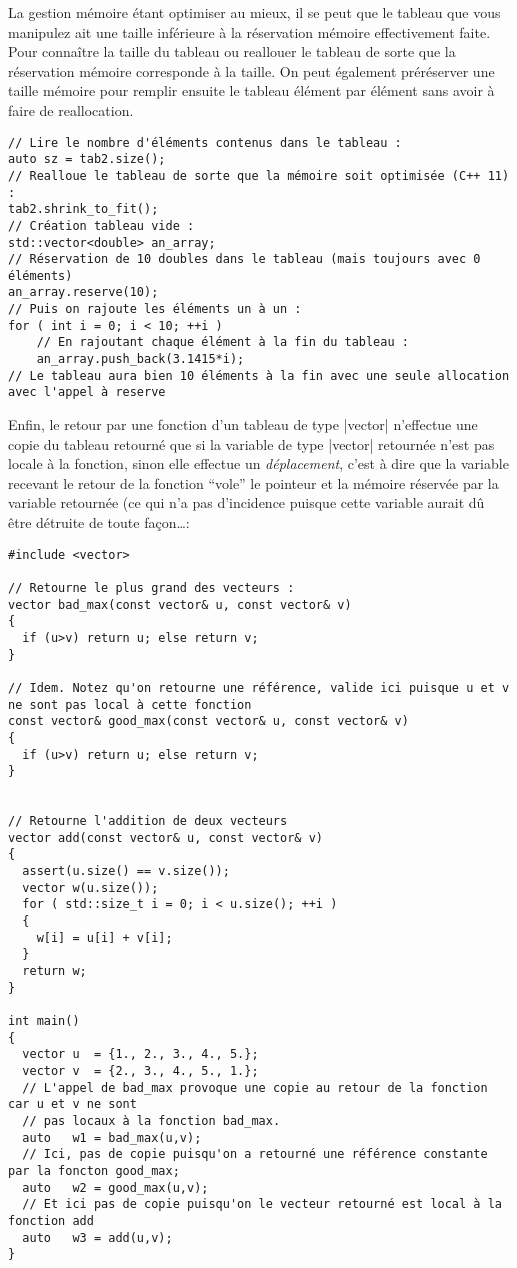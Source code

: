La gestion mémoire étant optimiser au mieux, il se peut que le tableau que vous manipulez ait une taille inférieure à la réservation mémoire effectivement faite. Pour connaître la taille du tableau ou reallouer le tableau de sorte que la réservation mémoire corresponde à la taille.
On peut également préréserver une taille mémoire pour remplir ensuite le tableau élément par élément sans avoir à faire de reallocation.

\begin{lstlisting}
// Lire le nombre d'éléments contenus dans le tableau :
auto sz = tab2.size();
// Realloue le tableau de sorte que la mémoire soit optimisée (C++ 11) :
tab2.shrink_to_fit(); 
// Création tableau vide :
std::vector<double> an_array;
// Réservation de 10 doubles dans le tableau (mais toujours avec 0 éléments)
an_array.reserve(10);
// Puis on rajoute les éléments un à un :
for ( int i = 0; i < 10; ++i )
    // En rajoutant chaque élément à la fin du tableau :
    an_array.push_back(3.1415*i);
// Le tableau aura bien 10 éléments à la fin avec une seule allocation avec l'appel à reserve
\end{lstlisting}

Enfin, le retour par une fonction d'un tableau de type |vector| n'effectue une copie du tableau retourné
que si la variable de type |vector| retournée n'est pas locale à la fonction, sinon
elle effectue un \textsl{déplacement}, c'est à dire que la variable recevant le retour de la fonction ``vole'' le pointeur et la mémoire réservée par la variable retournée (ce qui n'a pas d'incidence puisque cette variable aurait dû être détruite de toute façon\ldots :

\begin{lstlisting}[caption=retour d'une variable de type vector]
#include <vector>

// Retourne le plus grand des vecteurs :
vector bad_max(const vector& u, const vector& v)
{
  if (u>v) return u; else return v;
}

// Idem. Notez qu'on retourne une référence, valide ici puisque u et v ne sont pas local à cette fonction
const vector& good_max(const vector& u, const vector& v)
{
  if (u>v) return u; else return v;
}


// Retourne l'addition de deux vecteurs
vector add(const vector& u, const vector& v)
{
  assert(u.size() == v.size());
  vector w(u.size());
  for ( std::size_t i = 0; i < u.size(); ++i )
  {
    w[i] = u[i] + v[i];
  }
  return w;
}

int main()
{
  vector u  = {1., 2., 3., 4., 5.};
  vector v  = {2., 3., 4., 5., 1.};
  // L'appel de bad_max provoque une copie au retour de la fonction car u et v ne sont
  // pas locaux à la fonction bad_max.
  auto   w1 = bad_max(u,v);
  // Ici, pas de copie puisqu'on a retourné une référence constante par la foncton good_max;
  auto   w2 = good_max(u,v);
  // Et ici pas de copie puisqu'on le vecteur retourné est local à la fonction add
  auto   w3 = add(u,v);
}
\end{lstlisting}

